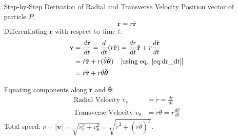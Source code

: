 \begin{proofbox}{Step-by-Step Derivation of Radial and Transverse Velocity}
Position vector of particle $P$:
\begin{equation*}
    \mathbf{r} = r \hat{\mathbf{r}}
\end{equation*}
Differentiating $\mathbf{r}$ with respect to time $t$:
\begin{align*}
    \mathbf{v} &= \frac{d\mathbf{r}}{dt} = \frac{d}{dt}(r \hat{\mathbf{r}}) = \frac{dr}{dt} \hat{\mathbf{r}} + r \frac{d\hat{\mathbf{r}}}{dt} \\
    &= \dot{r} \hat{\mathbf{r}} + r (\dot{\theta} \hat{\boldsymbol{\theta}}) \quad \text{[using eq. \eqref{eq:dr_dt}]} \\
    &= \dot{r} \hat{\mathbf{r}} + r \dot{\theta} \hat{\boldsymbol{\theta}}
\end{align*}

Equating components along $\hat{\mathbf{r}}$ and $\hat{\boldsymbol{\theta}}$:
\begin{align}
    \text{Radial Velocity } v_r &= \dot{r} = \frac{dr}{dt} \\
    \text{Transverse Velocity } v_\theta &= r \dot{\theta} = r \frac{d\theta}{dt}
\end{align}
Total speed: $v = |\mathbf{v}| = \sqrt{v_r^2 + v_\theta^2} = \sqrt{\dot{r}^2 + (r\dot{\theta})^2}$.
\end{proofbox}

